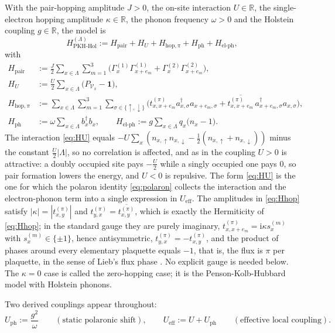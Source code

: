 \documentclass[11pt]{article}
\numberwithin{equation}{section}
\newcommand{\ii}{\mathrm{i}}
\newcommand{\id}{\mathbf{1}}
\newcommand{\R}{\mathbb{R}}
\newcommand{\Lamb}{\Lambda}
\newcommand{\ph}{\mathrm{ph}}
\newcommand{\eff}{\mathrm{eff}}
\newcommand{\hop}{\mathrm{hop}}
\newcommand{\pair}{\mathrm{pair}}
\newcommand{\PKH}{\mathrm{PKH\text{-}Hol}}
\newcommand{\Gam}{\Gamma}
\theoremstyle{definition}
\begin{document}
With the pair-hopping amplitude $J>0$, the on-site interaction $U\in\R$, the
single-electron hopping amplitude $\kappa\in\R$, the phonon frequency $\omega>0$ and the
Holstein coupling $g\in\R$, the model is
\begin{equation}
H^{(\Lamb)}_{\PKH}:=H_{\pair}+H_{U}+H_{\hop,\pi}+H_{\ph}+H_{\text{el-ph}},
\label{eq:H}
\end{equation}
with
\begin{align}
H_{\pair}&:=\frac{J}{2}\sum_{x\in\Lamb}\sum_{m=1}^{3}
\Big(\Gam^{(1)}_{x}\Gam^{(1)}_{x+e_{m}}+\Gam^{(2)}_{x}\Gam^{(2)}_{x+e_{m}}\Big),
\label{eq:Hpair}\\
H_{U}&:=\frac{U}{2}\sum_{x\in\Lamb}\big(P_{\mathcal{V}_{x}}-\id\big),
\label{eq:HU}\\
H_{\hop,\pi}&:=\sum_{x\in\Lamb}\sum_{m=1}^{3}\sum_{\sigma\in\{\uparrow,\downarrow\}}
\Big(t^{(\pi)}_{x,x+e_{m}}a_{x,\sigma}^{\dagger}a_{x+e_{m},\sigma}
+\overline{t^{(\pi)}_{x,x+e_{m}}}\,a_{x+e_{m},\sigma}^{\dagger}a_{x,\sigma}\Big),
\label{eq:Hhop}\\
H_{\ph}&:=\omega\sum_{x\in\Lamb}b_{x}^{\dagger}b_{x},\qquad
H_{\text{el-ph}}:=g\sum_{x\in\Lamb}q_{x}\big(n_{x}-1\big).
\label{eq:Hph}
\end{align}
The interaction \eqref{eq:HU} equals $-U\sum_{x}(n_{x,\uparrow}n_{x,\downarrow}-\frac12(n_{x,\uparrow}+n_{x,\downarrow}))$
minus the constant $\frac{U}{2}|\Lamb|$, so no correlation is affected, and as in
\cite{rens2026pkodlro} the coupling $U>0$ is attractive: a doubly occupied site pays
$-\frac{U}{2}$ while a singly occupied one pays $0$, so pair formation lowers the energy,
and $U<0$ is repulsive. The form \eqref{eq:HU} is the one for which the polaron identity
\eqref{eq:polaron} collects the interaction and the electron-phonon term into a single
expression in $U_{\eff}$. The amplitudes in \eqref{eq:Hhop} satisfy $|\kappa|=|t^{(\pi)}_{x,y}|$ and
$t^{(\pi)}_{y,x}=\overline{t^{(\pi)}_{x,y}}$, which is exactly the Hermiticity of
\eqref{eq:Hhop}; in the standard gauge they are purely imaginary,
$t^{(\pi)}_{x,x+e_{m}}=\ii\kappa s^{(m)}_{x}$ with $s^{(m)}_{x}\in\{\pm1\}$, hence
antisymmetric, $t^{(\pi)}_{y,x}=-t^{(\pi)}_{x,y}$, and the product of phases around every
elementary plaquette equals $-1$, that is, the flux is $\pi$ per plaquette, in the sense
of Lieb's flux phase \cite{lieb1994,macris1996}. No explicit gauge is needed below. The
$\kappa=0$ case is called the zero-hopping case; it is the Penson-Kolb-Hubbard model
with Holstein phonons.

Two derived couplings appear throughout:
\begin{equation}
U_{\mathrm{ph}}:=\frac{g^{2}}{\omega}\qquad(\text{static polaronic shift}),
\qquad
U_{\eff}:=U+U_{\mathrm{ph}}\qquad(\text{effective local coupling}).
\label{eq:Uph}
\end{equation}
\end{document}
